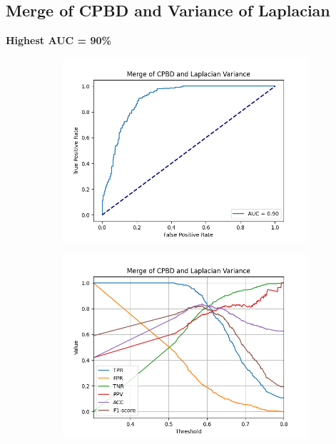 \subsection{Merge of CPBD and Variance of Laplacian}
\textbf{Highest AUC = 90\%}
\begin{figure}[H]
    \centering
    \begin{subfigure}[t]{0.48\textwidth}
        \includegraphics[width=\textwidth]{Figures/results_on_thresholds/output_roc_cpbd_lv.png}
        \caption{}
        \label{fig:CPBD_LV_roc}
    \end{subfigure}\hspace{1em}
    \begin{subfigure}[t]{0.48\textwidth}
        \includegraphics[width=\textwidth]{Figures/results_on_thresholds/threshold_test_scores_cpbd_lv.png}

\end{subfigure}
\end{figure}

